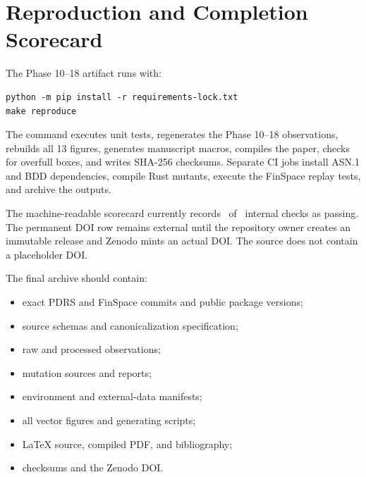 \section{Reproduction and Completion Scorecard}
The Phase 10--18 artifact runs with:
\begin{verbatim}
python -m pip install -r requirements-lock.txt
make reproduce
\end{verbatim}
The command executes unit tests, regenerates the Phase 10--18 observations, rebuilds all 13 figures, generates manuscript macros, compiles the paper, checks for overfull boxes, and writes SHA-256 checksums. Separate CI jobs install ASN.1 and BDD dependencies, compile Rust mutants, execute the FinSpace replay tests, and archive the outputs.

The machine-readable scorecard currently records \ScorecardPassed\ of \ScorecardTotal\ internal checks as passing. The permanent DOI row remains external until the repository owner creates an immutable release and Zenodo mints an actual DOI. The source does not contain a placeholder DOI.

The final archive should contain:
\begin{itemize}
  \item exact PDRS and FinSpace commits and public package versions;
  \item source schemas and canonicalization specification;
  \item raw and processed observations;
  \item mutation sources and reports;
  \item environment and external-data manifests;
  \item all vector figures and generating scripts;
  \item LaTeX source, compiled PDF, and bibliography;
  \item checksums and the Zenodo DOI.
\end{itemize}
